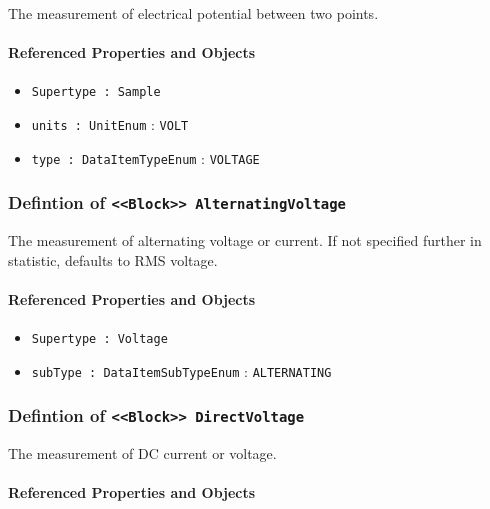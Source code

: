 \FloatBarrier

The measurement of electrical potential between two points.

\FloatBarrier
\paragraph{Referenced Properties and Objects}

\begin{itemize}
\item \texttt{Supertype : Sample}

\item \texttt{units : UnitEnum} : \texttt{VOLT}

\item \texttt{type : DataItemTypeEnum} : \texttt{VOLTAGE}

\end{itemize}
\FloatBarrier
\subsubsection{Defintion of \texttt{<<Block>> AlternatingVoltage}}
  \label{type:AlternatingVoltage}

\FloatBarrier

The measurement of alternating voltage or current.   If not specified further in statistic, defaults to RMS voltage. 

\FloatBarrier
\paragraph{Referenced Properties and Objects}

\begin{itemize}
\item \texttt{Supertype : Voltage}

\item \texttt{subType : DataItemSubTypeEnum} : \texttt{ALTERNATING}

\end{itemize}
\FloatBarrier
\subsubsection{Defintion of \texttt{<<Block>> DirectVoltage}}
  \label{type:DirectVoltage}

\FloatBarrier

The measurement of DC current or voltage.

\FloatBarrier
\paragraph{Referenced Properties and Objects}

